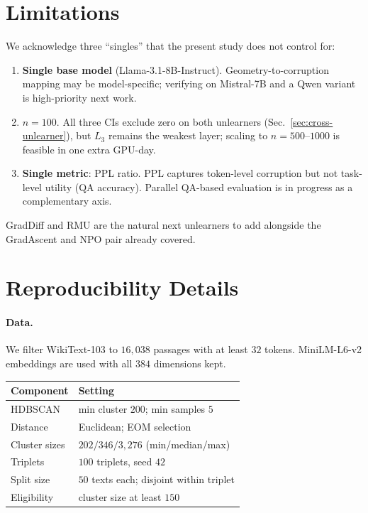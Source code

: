 \documentclass[11pt]{article}
\newcommand{\Lthree}{L_3}
\begin{document}
\section{Limitations}
\label{sec:limitations}

We acknowledge three ``singles'' that the present study does not control for:
\begin{enumerate}
    \setlength\itemsep{0.15em}
    \item \textbf{Single base model} (Llama-3.1-8B-Instruct). Geometry-to-corruption mapping may be model-specific; verifying on Mistral-7B and a Qwen variant is high-priority next work.
    \item \textbf{$n{=}100$}. All three CIs exclude zero on both unlearners (Sec.~\ref{sec:cross-unlearner}), but $\Lthree$ remains the weakest layer; scaling to $n{=}500$--$1000$ is feasible in one extra GPU-day.
    \item \textbf{Single metric}: PPL ratio. PPL captures token-level corruption but not task-level utility (QA accuracy). Parallel QA-based evaluation is in progress as a complementary axis.
\end{enumerate}
GradDiff and RMU are the natural next unlearners to add alongside the GradAscent
and NPO pair already covered.

%


\appendix

\section{Reproducibility Details}
\label{app:repro}

\paragraph{Data.} We filter WikiText-103 to $16{,}038$ passages with at least
$32$ tokens. MiniLM-L6-v2 embeddings are used with all $384$ dimensions kept.
\begin{center}
\footnotesize
\begin{tabular}{@{}ll@{}}
    \toprule
    Component & Setting \\
    \midrule
    HDBSCAN & min cluster $200$; min samples $5$ \\
    Distance & Euclidean; EOM selection \\
    Cluster sizes & $202 / 346 / 3{,}276$ (min/median/max) \\
    Triplets & $100$ triplets, seed $42$ \\
    Split size & $50$ texts each; disjoint within triplet \\
    Eligibility & cluster size at least $150$ \\
    \bottomrule
\end{tabular}
\end{center}
\end{document}

